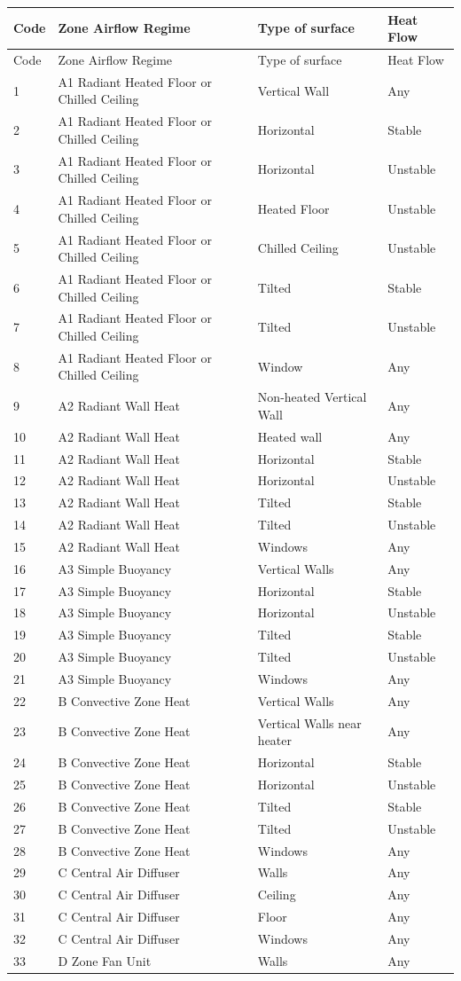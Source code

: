\begin{longtable}[c]{p{1.5in}p{1.5in}p{1.5in}p{1.5in}}
\toprule
Code & Zone Airflow Regime & Type of surface & Heat Flow \tabularnewline
\midrule
\endfirsthead

\toprule
Code & Zone Airflow Regime & Type of surface & Heat Flow \tabularnewline
\midrule
\endhead

1 & A1 Radiant Heated Floor or Chilled Ceiling & Vertical Wall & Any \tabularnewline
2 & A1 Radiant Heated Floor or Chilled Ceiling & Horizontal & Stable \tabularnewline
3 & A1 Radiant Heated Floor or Chilled Ceiling & Horizontal & Unstable \tabularnewline
4 & A1 Radiant Heated Floor or Chilled Ceiling & Heated Floor & Unstable \tabularnewline
5 & A1 Radiant Heated Floor or Chilled Ceiling & Chilled Ceiling & Unstable \tabularnewline
6 & A1 Radiant Heated Floor or Chilled Ceiling & Tilted & Stable \tabularnewline
7 & A1 Radiant Heated Floor or Chilled Ceiling & Tilted & Unstable \tabularnewline
8 & A1 Radiant Heated Floor or Chilled Ceiling & Window & Any \tabularnewline
9 & A2 Radiant Wall Heat & Non-heated Vertical Wall & Any \tabularnewline
10 & A2 Radiant Wall Heat & Heated wall & Any \tabularnewline
11 & A2 Radiant Wall Heat & Horizontal & Stable \tabularnewline
12 & A2 Radiant Wall Heat & Horizontal & Unstable \tabularnewline
13 & A2 Radiant Wall Heat & Tilted & Stable \tabularnewline
14 & A2 Radiant Wall Heat & Tilted & Unstable \tabularnewline
15 & A2 Radiant Wall Heat & Windows & Any \tabularnewline
16 & A3 Simple Buoyancy & Vertical Walls & Any \tabularnewline
17 & A3 Simple Buoyancy & Horizontal & Stable \tabularnewline
18 & A3 Simple Buoyancy & Horizontal & Unstable \tabularnewline
19 & A3 Simple Buoyancy & Tilted & Stable \tabularnewline
20 & A3 Simple Buoyancy & Tilted & Unstable \tabularnewline
21 & A3 Simple Buoyancy & Windows & Any \tabularnewline
22 & B Convective Zone Heat & Vertical Walls & Any \tabularnewline
23 & B Convective Zone Heat & Vertical Walls near heater & Any \tabularnewline
24 & B Convective Zone Heat & Horizontal & Stable \tabularnewline
25 & B Convective Zone Heat & Horizontal & Unstable \tabularnewline
26 & B Convective Zone Heat & Tilted & Stable \tabularnewline
27 & B Convective Zone Heat & Tilted & Unstable \tabularnewline
28 & B Convective Zone Heat & Windows & Any \tabularnewline
29 & C Central Air Diffuser & Walls & Any \tabularnewline
30 & C Central Air Diffuser & Ceiling & Any \tabularnewline
31 & C Central Air Diffuser & Floor & Any \tabularnewline
32 & C Central Air Diffuser & Windows & Any \tabularnewline
33 & D Zone Fan Unit & Walls & Any \tabularnewline

\end{longtable}
